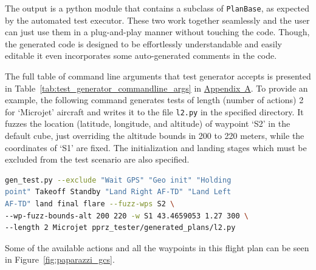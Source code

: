 The output is a python module that contains a subclass of \verb|PlanBase|, as expected by the automated test executor. These two work together seamlessly and the user can just use them in a plug-and-play manner without touching the code. Though, the generated code is designed to be effortlessly understandable and easily editable it even incorporates some auto-generated comments in the code.

The full table of command line arguments that test generator accepts is presented in Table~\ref{tab:test_generator_commandline_args} in \hyperref[appendixa]{Appendix~A}. To provide an example, the following command generates tests of length (number of actions) 2 for `Microjet' aircraft and writes it to the file \verb|l2.py| in the specified directory. It fuzzes the location (latitude, longitude, and altitude) of waypoint `S2' in the default cube, just overriding the altitude bounds in 200 to 220 meters, while the coordinates of `S1' are fixed. The initialization and landing stages which must be excluded from the test scenario are also specified. 
\begin{lstlisting}[language=bash]
gen_test.py --exclude "Wait GPS" "Geo init" "Holding 
point" Takeoff Standby "Land Right AF-TD" "Land Left 
AF-TD" land final flare --fuzz-wps S2 \
--wp-fuzz-bounds-alt 200 220 -w S1 43.4659053 1.27 300 \
--length 2 Microjet pprz_tester/generated_plans/l2.py
\end{lstlisting}
Some of the available actions and all the waypoints in this flight plan can be seen in Figure~\ref{fig:paparazzi_gcs}.